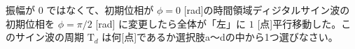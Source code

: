 振幅が $0$ ではなくて、初期位相が $\phi = 0$ [rad]の時間領域ディジタルサイン波の初期位相を $\phi = \pi/2$ [rad] に変更したら全体が「左」に $1$ [点]平行移動した。このサイン波の周期 $\textrm{T}_d$ は何[点]であるか選択肢a〜dの中から1つ選びなさい。
